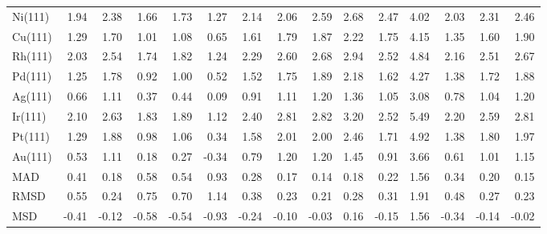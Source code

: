 \begin{table}[h]
\begin{tabular}{lrrrrrrrrrrrrrr}
Ni(111) & 1.94 & 2.38 & 1.66 & 1.73 & 1.27 & 2.14 & 2.06 & 2.59 & 2.68 & 2.47 & 4.02 & 2.03 & 2.31 & 2.46 \\
Cu(111) & 1.29 & 1.70 & 1.01 & 1.08 & 0.65 & 1.61 & 1.79 & 1.87 & 2.22 & 1.75 & 4.15 & 1.35 & 1.60 & 1.90 \\
Rh(111) & 2.03 & 2.54 & 1.74 & 1.82 & 1.24 & 2.29 & 2.60 & 2.68 & 2.94 & 2.52 & 4.84 & 2.16 & 2.51 & 2.67 \\
Pd(111) & 1.25 & 1.78 & 0.92 & 1.00 & 0.52 & 1.52 & 1.75 & 1.89 & 2.18 & 1.62 & 4.27 & 1.38 & 1.72 & 1.88 \\
Ag(111) & 0.66 & 1.11 & 0.37 & 0.44 & 0.09 & 0.91 & 1.11 & 1.20 & 1.36 & 1.05 & 3.08 & 0.78 & 1.04 & 1.20 \\
Ir(111) & 2.10 & 2.63 & 1.83 & 1.89 & 1.12 & 2.40 & 2.81 & 2.82 & 3.20 & 2.52 & 5.49 & 2.20 & 2.59 & 2.81 \\
Pt(111) & 1.29 & 1.88 & 0.98 & 1.06 & 0.34 & 1.58 & 2.01 & 2.00 & 2.46 & 1.71 & 4.92 & 1.38 & 1.80 & 1.97 \\
Au(111) & 0.53 & 1.11 & 0.18 & 0.27 & -0.34 & 0.79 & 1.20 & 1.20 & 1.45 & 0.91 & 3.66 & 0.61 & 1.01 & 1.15 \\
MAD & 0.41 & 0.18 & 0.58 & 0.54 & 0.93 & 0.28 & 0.17 & 0.14 & 0.18 & 0.22 & 1.56 & 0.34 & 0.20 & 0.15 \\
RMSD & 0.55 & 0.24 & 0.75 & 0.70 & 1.14 & 0.38 & 0.23 & 0.21 & 0.28 & 0.31 & 1.91 & 0.48 & 0.27 & 0.23 \\
MSD & -0.41 & -0.12 & -0.58 & -0.54 & -0.93 & -0.24 & -0.10 & -0.03 & 0.16 & -0.15 & 1.56 & -0.34 & -0.14 & -0.02 \\
\bottomrule
\end{tabular}

\end{table}